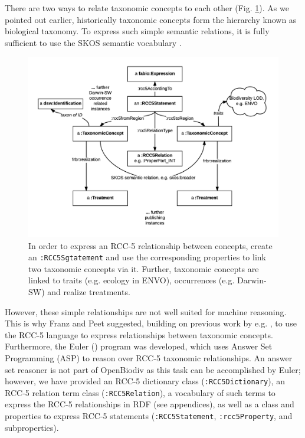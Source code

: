 There are two ways to relate taxonomic concepts to each other (Fig. \ref{taxonomic-concept-relationships-diagram}). As we pointed out earlier, historically taxonomic concepts form the hierarchy known as biological taxonomy. To express such simple semantic relations, it is fully sufficient to use the SKOS semantic vocabulary \cite{miles_skos_nodate}. 

\begin{figure}[h!]
\centering
  \includegraphics[width=\textwidth]{Figures/taxonomic-concept-relationships-diagram}
  \decoRule
  \caption[Taxonomic concept relationships diagram.]{In order to express an RCC-5 relationship between concepts, create an {\tt :RCC5Sgtatement} and use the corresponding properties to link two taxonomic concepts via it. Further, taxonomic concepts are linked to traits (e.g. ecology in ENVO), occurrences (e.g. Darwin-SW) and realize treatments.}
  \label{taxonomic-concept-relationships-diagram}
\end{figure}

However, these simple relationships are not well suited for machine reasoning. This is why Franz and Peet \cite{franz_perspectives:_2009} suggested, building on previous work by e.g. \cite{koperski_referenzliste_2000}, to use the RCC-5 language to express relationships between taxonomic concepts. Furthermore, the Euler (\cite{chen_euler/x:_2014}) program was developed, which uses Answer Set Programming (ASP) to reason over RCC-5 taxonomic relationships. An answer set reasoner is not part of  OpenBiodiv as this task can be accomplished by Euler; however, we have provided an RCC-5 dictionary class ({\tt :RCC5Dictionary}), an RCC-5 relation term class ({\tt :RCC5Relation}), a vocabulary of such terms to express the RCC-5 relationships in RDF (see appendices), as well as a class and properties to express RCC-5 statements ({\tt :RCC5Statement}, {\tt :rcc5Property}, and subproperties). 


